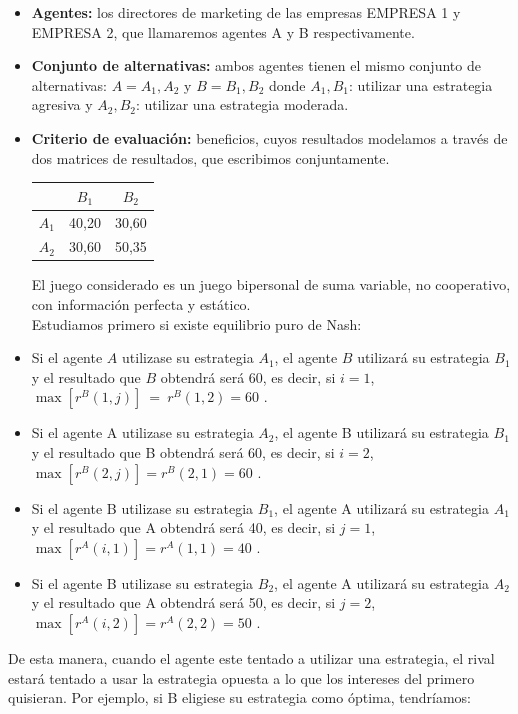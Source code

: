 \begin{itemize}
    \item \textbf{Agentes:} los directores de marketing de las empresas EMPRESA 1 y EMPRESA 2, que llamaremos agentes A y B respectivamente.
    \item \textbf{Conjunto de alternativas:} ambos agentes tienen el mismo conjunto de alternativas: $A = {A_1,A_2}$ y $B={B_1,B_2}$ donde $A_1,B_1$: utilizar una estrategia agresiva y $A_2,B_2$: utilizar una estrategia moderada.
    \item \textbf{Criterio de evaluación:} beneficios, cuyos resultados modelamos a través de dos matrices de resultados, que escribimos conjuntamente.\\
    \begin{center}
    \begin{tabular}{ccc}
    \hline
       & $B_1$    & $B_2$    \\ \hline
    $A_1$ & 40,20 & 30,60 \\
    $A_2$ & 30,60  & 50,35  \\ \hline
    \end{tabular}
    \end{center}
    El juego considerado es un juego bipersonal de suma variable, no cooperativo, con información perfecta y estático.
    \\
    Estudiamos primero si existe equilibrio puro de Nash:
    \item Si el agente $A$ utilizase su estrategia $A_1$, el agente $B$ utilizará su estrategia $B_1$ y el resultado que $B$ obtendrá será 60, es decir, si $i=1$,$\max \left[ r^B(1,j)\right] \: = \: r^B(1,2) = 60$ .
    \item Si el agente A utilizase su estrategia $A_2$, el agente B utilizará su estrategia $B_1$ y el resultado que B obtendrá será 60, es decir, si $i=2$,$\max \left[ r^B (2,j)\right] = r^B(2,1)=60$  .
    \item Si el agente B utilizase su estrategia $B_1$, el agente A utilizará su estrategia $A_1$ y el resultado que A obtendrá será 40, es decir, si $j=1$,$\max \left[ r^A (i,1)\right] = r^A(1,1)=40$  .
    \item Si el agente B utilizase su estrategia $B_2$, el agente A utilizará su estrategia $A_2$ y el resultado que A obtendrá será 50, es decir, si $j=2$, $\max \left[ r^A (i,2)\right] = r^A(2,2)=50$ .
\end{itemize}
De esta manera, cuando el agente este tentado a utilizar una estrategia, el rival estará tentado a usar la estrategia opuesta a lo que los intereses del primero quisieran. Por ejemplo, si B eligiese su estrategia  como óptima, tendríamos:
